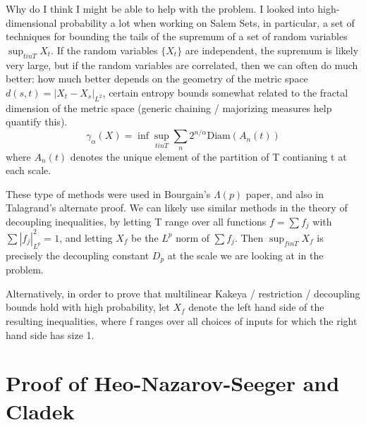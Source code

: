 \documentclass[11pt]{article}
\begin{document}
    Why do I think I might be able to help with the problem. I looked into high-dimensional probability a lot when working on Salem Sets, in particular, a set of techniques for bounding the tails of the supremum of a set of random variables $\sup_{t in T} X_t$. If the random variables $\{ X_t \}$ are independent, the supremum is likely very large, but if the random variables are correlated, then we can often do much better: how much better depends on the geometry of the metric space $d(s,t) = | X_t - X_s |_{L^2}$, certain entropy bounds somewhat related to the fractal dimension of the metric space (generic chaining / majorizing measures help quantify this).
    \[ \gamma_\alpha(X) = \inf \sup_{t in T} \sum_n 2^{n/\alpha} \text{Diam}(A_n(t)) \]
    where $A_n(t)$ denotes the unique element of the partition of T contianing t at each scale.

    These type of methods were used in Bourgain's $\Lambda(p)$ paper, and also in Talagrand's alternate proof. We can likely use similar methods in the theory of decoupling inequalities, by letting T range over all functions $f = \sum f_j$ with $\sum | f_j |_{L^p}^2 = 1$, and letting $X_f$ be the $L^p$ norm of $\sum f_j$. Then $\sup_{f in T} X_f$ is precisely the decoupling constant $D_p$ at the scale we are looking at in the problem.

    Alternatively, in order to prove that multilinear Kakeya / restriction / decoupling bounds hold with high probability, let $X_f$ denote the left hand side of the resulting inequalities, where f ranges over all choices of inputs for which the right hand side has size 1.
















\section{Proof of Heo-Nazarov-Seeger and Cladek}
\end{document}
